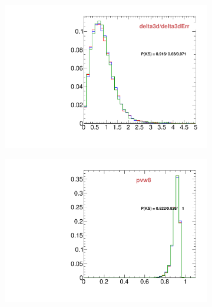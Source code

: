 \begin{figure}
\begin{subfigure}[b]{0.2\textwidth}
                \includegraphics[width=\textwidth]{Figures/VariablesComparison/MC_barrel_figs_3h/delta3dErr}
                \label{fig:MC_barrel_delta3d/delta3dErr_3h}
        \end{subfigure}
        \begin{subfigure}[b]{0.2\textwidth}
                \centering
                \includegraphics[width=\textwidth]{Figures/VariablesComparison/MC_barrel_figs_3h/pvw8}
                \label{fig:MC_barrel_pvw8_3h}
        \end{subfigure}
        \begin{subfigure}[b]{0.2\textwidth}
                \centering

\end{subfigure}
\end{figure}
